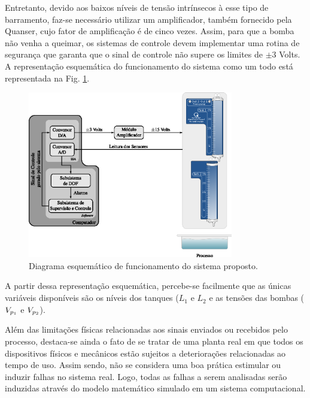 
Entretanto, devido aos baixos níveis de tensão intrínsecos à esse tipo de
barramento, faz-se necessário utilizar um amplificador, também fornecido pela
Quanser\reg, cujo fator de amplificação é de cinco vezes. Assim, para que a
bomba não venha a queimar, os sistemas de controle devem implementar uma rotina
de segurança que garanta que o sinal de controle não supere os limites de $\pm
3$ Volts. A representação esquemática do funcionamento do sistema como um todo
está representada na Fig. \ref{fig:func_sistema}.

\begin{figure}[htb]
\centering
    \includegraphics[width=0.8\textwidth]{imgs/sistema/eps/func_sistema}
    \caption{Diagrama esquemático de funcionamento do sistema proposto.}
    \label{fig:func_sistema}
\end{figure}

A partir dessa representação esquemática, percebe-se facilmente que as únicas
variáveis disponíveis são os níveis dos tanques ($L_1$ e $L_2$ e as tensões das
bombas ($V_{p_{\tiny 1}}$ e $V_{p_{\tiny 2}}$).

Além das limitações físicas relacionadas aos sinais enviados ou recebidos pelo
processo, destaca-se ainda o fato de se tratar de uma planta real em que todos
os dispositivos físicos e mecânicos estão sujeitos a deteriorações relacionadas
ao tempo de uso. Assim sendo, não se considera uma boa prática estimular ou
induzir falhas no sistema real. Logo, todas as falhas a serem analisadas serão
induzidas através do modelo matemático simulado em um sistema computacional.

